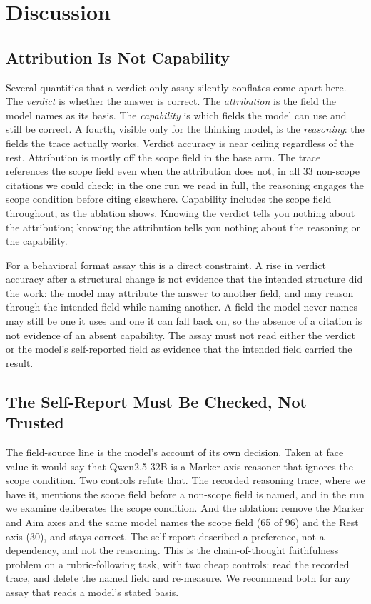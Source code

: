 \documentclass[11pt,a4paper]{article}
\begin{document}
\section{Discussion}

\subsection{Attribution Is Not Capability}

Several quantities that a verdict-only assay silently conflates come apart here.
The \emph{verdict} is whether the answer is correct. The \emph{attribution} is the
field the model names as its basis. The \emph{capability} is which fields the model
can use and still be correct. A fourth, visible only for the thinking model, is the
\emph{reasoning}: the fields the trace actually works. Verdict accuracy is near
ceiling regardless of the rest. Attribution is mostly off the scope field in the
base arm. The trace references the scope field even when the attribution does not,
in all 33 non-scope citations we could check; in the one run we read in full, the
reasoning engages the scope condition before citing elsewhere. Capability includes the scope field
throughout, as the ablation shows. Knowing the verdict tells you nothing about the
attribution; knowing the attribution tells you nothing about the reasoning or the
capability.

For a behavioral format assay this is a direct constraint. A rise in verdict
accuracy after a structural change is not evidence that the intended structure did
the work: the model may attribute the answer to another field, and may reason
through the intended field while naming another. A field the model never names may
still be one it uses and one it can fall back on, so the absence of a citation is
not evidence of an absent capability. The assay must not read either the verdict or
the model's self-reported field as evidence that the intended field carried the
result.

\subsection{The Self-Report Must Be Checked, Not Trusted}

The field-source line is the model's account of its own decision. Taken at face
value it would say that Qwen2.5-32B is a Marker-axis reasoner that ignores the
scope condition. Two controls refute that. The recorded reasoning trace, where we have it,
mentions the scope field before a non-scope field is named, and in the run we
examine deliberates the scope condition. And the
ablation: remove the Marker and Aim axes and the same model names the scope field
(65 of 96) and the Rest axis (30), and stays correct. The self-report described a
preference, not a dependency, and not the reasoning. This is the chain-of-thought
faithfulness problem \citep{turpin2023, lanham2023, chen2025reasoning} on a
rubric-following task, with two cheap controls: read the recorded trace, and
delete the named field and re-measure. We recommend both for any assay that reads
a model's stated basis.
\end{document}
